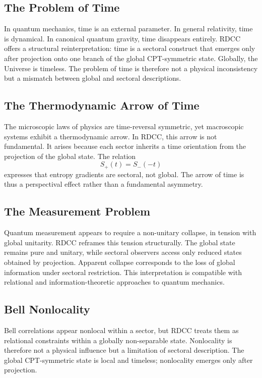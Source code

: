 \documentclass[11pt,a4paper]{article}
\begin{document}
\subsection{The Problem of Time}

In quantum mechanics, time is an external parameter. In general relativity, time is dynamical. In canonical quantum gravity, time disappears entirely. RDCC offers a structural reinterpretation: time is a sectoral construct that emerges only after projection onto one branch of the global CPT-symmetric state. Globally, the Universe is timeless. The problem of time is therefore not a physical inconsistency but a mismatch between global and sectoral descriptions.

\subsection{The Thermodynamic Arrow of Time}

The microscopic laws of physics are time-reversal symmetric, yet macroscopic systems exhibit a thermodynamic arrow. In RDCC, this arrow is not fundamental. It arises because each sector inherits a time orientation from the projection of the global state. The relation
\[
S_{+}(t) = S_{-}(-t)
\]
expresses that entropy gradients are sectoral, not global. The arrow of time is thus a perspectival effect rather than a fundamental asymmetry.

\subsection{The Measurement Problem}

Quantum measurement appears to require a non-unitary collapse, in tension with global unitarity. RDCC reframes this tension structurally. The global state remains pure and unitary, while sectoral observers access only reduced states obtained by projection. Apparent collapse corresponds to the loss of global information under sectoral restriction. This interpretation is compatible with relational and information-theoretic approaches to quantum mechanics.

\subsection{Bell Nonlocality}

Bell correlations appear nonlocal within a sector, but RDCC treats them as relational constraints within a globally non-separable state. Nonlocality is therefore not a physical influence but a limitation of sectoral description. The global CPT-symmetric state is local and timeless; nonlocality emerges only after projection.
\end{document}
